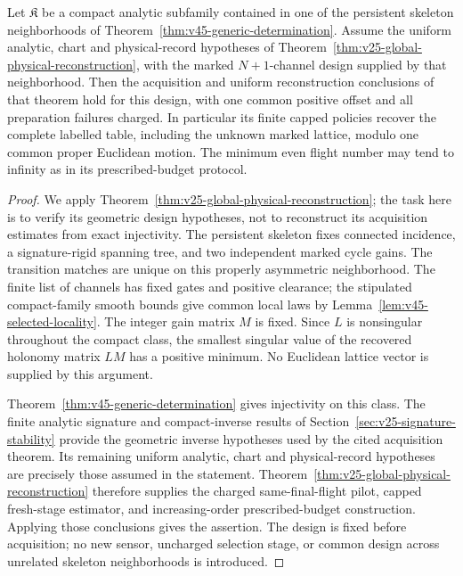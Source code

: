 \begin{corollary}
\label{cor:v45-physical-chart}
Let $\mathfrak K$ be a compact analytic subfamily contained in one of the
persistent skeleton neighborhoods of
Theorem~\ref{thm:v45-generic-determination}.  Assume the uniform analytic,
chart and physical-record hypotheses of
Theorem~\ref{thm:v25-global-physical-reconstruction}, with the marked
$N+1$-channel design supplied by that neighborhood.  Then the acquisition
and uniform reconstruction conclusions of that theorem hold for this
design, with one common positive offset and all preparation failures
charged.  In particular its finite capped policies recover the complete
labelled table, including the unknown marked lattice, modulo one common
proper Euclidean motion.  The minimum even flight number may tend to
infinity as in its prescribed-budget protocol.
\end{corollary}

\begin{proof}
We apply Theorem~\ref{thm:v25-global-physical-reconstruction}; the task
here is to verify its geometric design hypotheses, not to reconstruct
its acquisition estimates from exact injectivity.
The persistent skeleton fixes connected incidence, a signature-rigid
spanning tree, and two independent marked cycle gains.  The transition
matches are unique on this properly asymmetric neighborhood.  The finite
list of channels has fixed gates and positive clearance; the stipulated
compact-family smooth bounds give common local laws by
Lemma~\ref{lem:v45-selected-locality}.  The integer gain matrix $M$ is
fixed.  Since $L$ is nonsingular throughout the compact class, the smallest
singular value of the recovered holonomy matrix $LM$ has a positive
minimum.  No Euclidean lattice vector is supplied by this argument.

Theorem~\ref{thm:v45-generic-determination} gives injectivity on this
class.  The finite analytic signature and compact-inverse results of
Section~\ref{sec:v25-signature-stability} provide the geometric inverse
hypotheses used by the cited acquisition theorem.  Its remaining uniform
analytic, chart and physical-record hypotheses are precisely those
assumed in the statement.  Theorem~\ref{thm:v25-global-physical-reconstruction}
therefore supplies the charged same-final-flight pilot, capped fresh-stage
estimator, and increasing-order prescribed-budget construction.  Applying
those conclusions gives the assertion.  The design is fixed before
acquisition; no new sensor, uncharged selection stage, or common design
across unrelated skeleton neighborhoods is introduced.
\end{proof}

